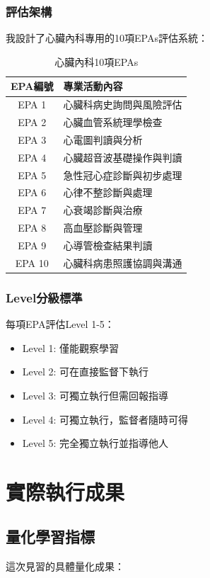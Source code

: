 \documentclass[12pt,a4paper]{article}
\begin{document}
\subsubsection{評估架構}
我設計了心臟內科專用的10項EPAs評估系統：

\begin{table}[h]
\centering
\caption{心臟內科10項EPAs}
\begin{tabular}{|c|p{8cm}|}
\hline
\textbf{EPA編號} & \textbf{專業活動內容} \\
\hline
EPA 1 & 心臟科病史詢問與風險評估 \\
EPA 2 & 心臟血管系統理學檢查 \\
EPA 3 & 心電圖判讀與分析 \\
EPA 4 & 心臟超音波基礎操作與判讀 \\
EPA 5 & 急性冠心症診斷與初步處理 \\
EPA 6 & 心律不整診斷與處理 \\
EPA 7 & 心衰竭診斷與治療 \\
EPA 8 & 高血壓診斷與管理 \\
EPA 9 & 心導管檢查結果判讀 \\
EPA 10 & 心臟科病患照護協調與溝通 \\
\hline
\end{tabular}
\end{table}

\subsubsection{Level分級標準}
每項EPA評估Level 1-5：
\begin{itemize}
\item Level 1: 僅能觀察學習
\item Level 2: 可在直接監督下執行
\item Level 3: 可獨立執行但需回報指導
\item Level 4: 可獨立執行，監督者隨時可得
\item Level 5: 完全獨立執行並指導他人
\end{itemize}

\section{實際執行成果}

\subsection{量化學習指標}

這次見習的具體量化成果：
\end{document}
